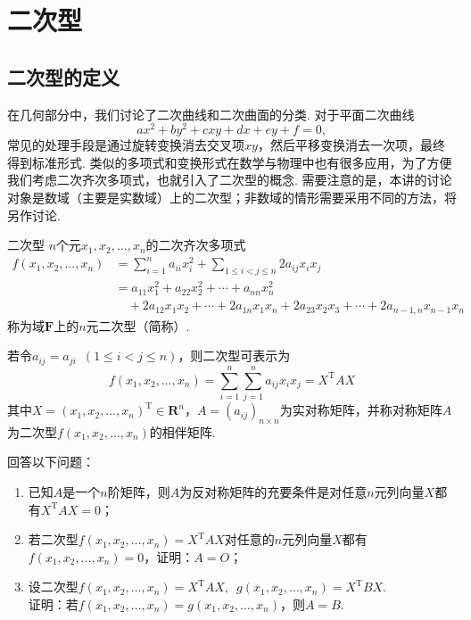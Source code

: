 \chapter{二次型}

\section{二次型的定义}

在几何部分中，我们讨论了二次曲线和二次曲面的分类. 对于平面二次曲线
\[ax^2 + by^2 + cxy + dx + ey + f = 0,\]
常见的处理手段是通过旋转变换消去交叉项$xy$，然后平移变换消去一次项，最终得到标准形式. 类似的多项式和变换形式在数学与物理中也有很多应用，为了方便我们考虑二次齐次多项式，也就引入了二次型的概念. 需要注意的是，本讲的讨论对象是数域（主要是实数域）上的二次型；非数域的情形需要采用不同的方法，将另作讨论.

\begin{definition}{二次型}{} 
    $n$个元$x_1,x_2,\ldots,x_n$的二次齐次多项式
    \begin{align*}
        f(x_1,x_2,\ldots,x_n) & = \sum_{i=1}^{n}a_{ii}x_i^2+\sum\limits_{1\leqslant i<j\leqslant n}2a_{ij}x_ix_j    \\
                              & = a_{11}x_1^2+a_{22}x_2^2+\cdots+a_{nn}x_n^2                                        \\
                              & \quad +2a_{12}x_1x_2+\cdots+2a_{1n}x_1x_n+2a_{23}x_2x_3+\cdots+2a_{n-1,n}x_{n-1}x_n
    \end{align*}
    称为域$\mathbf{F}$上的$n$元二次型（简称）.
\end{definition}

若令$a_{ij}=a_{ji}\enspace(1\leqslant i<j\leqslant n)$，则二次型可表示为
\[f(x_1,x_2,\ldots,x_n)=\sum_{i=1}^{n}\sum_{j=1}^{n}a_{ij}x_ix_j=X^\mathrm{T}AX\]
其中$X=(x_1,x_2,\ldots,x_n)^\mathrm{T}\in\mathbf{R}^n$，$A=(a_{ij})_{n\times n}$为实对称矩阵，并称对称矩阵$A$为二次型$f(x_1,x_2,\ldots,x_n)$的相伴矩阵.

\begin{example}{}{}
    回答以下问题：
    \begin{enumerate}
        \item 已知$A$是一个$n$阶矩阵，则$A$为反对称矩阵的充要条件是对任意$n$元列向量$X$都有$X^\mathrm{T}AX=0$；

        \item 若二次型$f(x_1,x_2,\ldots,x_n)=X^\mathrm{T}AX$对任意的$n$元列向量$X$都有$f(x_1,x_2,\ldots,x_n)=0$，证明：$A=O$；

        \item 设二次型$f(x_1,x_2,\ldots,x_n)=X^\mathrm{T}AX,\enspace g(x_1,x_2,\ldots,x_n)=X^\mathrm{T}BX$.\\
              证明：若$f(x_1,x_2,\ldots,x_n)=g(x_1,x_2,\ldots,x_n)$，则$A=B$.
    \end{enumerate}
\end{example}

